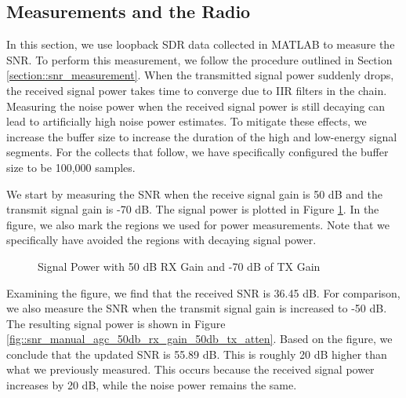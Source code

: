 \documentclass{article}
\begin{document}
\subsection{Measurements and the Radio}

In this section, we use loopback SDR data collected in MATLAB to measure the SNR. To perform this measurement, we follow the procedure outlined in Section \ref{section::snr_measurement}. When the transmitted signal power suddenly drops, the received signal power takes time to converge due to IIR filters in the chain. Measuring the noise power when the received signal power is still decaying can lead to artificially high noise power estimates. To mitigate these effects, we increase the buffer size to increase the duration of the high and low-energy signal segments. For the collects that follow, we have specifically configured the buffer size to be 100,000 samples.

We start by measuring the SNR when the receive signal gain is 50 dB and the transmit signal gain is -70 dB. The signal power is plotted in Figure \ref{fig::snr_manual_agc_50db_rx_gain_70db_tx_atten}. In the figure, we also mark the regions we used for power measurements. Note that we specifically have avoided the regions with decaying signal power.

\begin{figure}[H]
	\centerline{}
	\caption{Signal Power with 50 dB RX Gain and -70 dB of TX Gain}
	\label{fig::snr_manual_agc_50db_rx_gain_70db_tx_atten}
\end{figure}

Examining the figure, we find that the received SNR is 36.45 dB. For comparison, we also measure the SNR when the transmit signal gain is increased to -50 dB. The resulting signal power is shown in Figure \ref{fig::snr_manual_agc_50db_rx_gain_50db_tx_atten}. Based on the figure, we conclude that the updated SNR is 55.89 dB. This is roughly 20 dB higher than what we previously measured. This occurs because the received signal power increases by 20 dB, while the noise power remains the same.
\end{document}
